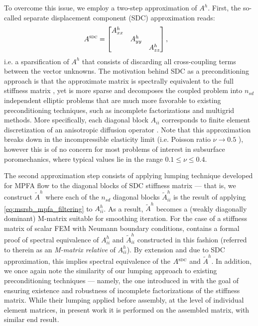 To overcome this issue, we employ a two-step approximation of $A^h$.   First, the so-called separate displacement component (SDC) \cite{Gustafsson1996} approximation reads:
\begin{align}
	A^{\textsc{sdc}} &=
    \begin{bmatrix}
  	    A_{xx}^h &          &        \\
  	             & A_{yy}^h &        \\
  	             &          & A_{zz}^h 
	\end{bmatrix},
    \label{eq:blk_stiff_SDC}
\end{align}
i.e. a sparsification of $A^h$ that consists of discarding all cross-coupling terms between the vector unknowns.   The motivation behind SDC as a preconditioning approach is that the approximate matrix is spectrally equivalent to the full stiffness matrix \cite{Blaheta1994,Gustaffson1998}, yet is more sparse and decomposes the coupled problem into $n_{sd}$ independent elliptic problems that are much more favorable to existing preconditioning techniques, such as incomplete factorizations and multigrid methods.   More specifically, each diagonal block $A_{ii}$ corresponds to finite element discretization of an anisotropic diffusion operator \cite{Bosma2021}.   Note that this approximation breaks down in the incompressible elasticity limit (i.e. Poisson ratio $\nu \to 0.5$ \cite{Axelsson1978}), however this is of no concern for most problems of interest in subsurface poromechanics, where typical values lie in the range $0.1 \leq \nu \leq 0.4$.

The second approximation step consists of applying lumping technique developed for MPFA flow to the diagonal blocks of SDC stiffness matrix --- that is, we construct $\tilde{A}^h$ where each of the $n_{sd}$ diagonal blocks $\tilde{A}_{ii}^h$ is the result of applying \eqref{eq:msrsb_mpfa_filtering} to $A_{ii}^h$.   As a result, $\tilde{A}^h$ becomes a (weakly diagonally dominant) M-matrix suitable for smoothing iteration.   For the case of a stiffness matrix of scalar FEM with Neumann boundary conditions, \cite{Xu2017} contains a formal proof of spectral equivalence of $A_{ii}^h$ and $\tilde{A}_{ii}^h$ constructed in this fashion (referred to therein as an \textit{M-matrix relative} of $A_{ii}^h$).   By extension and due to SDC approximation, this implies spectral equivalence of the $A^{\textsc{sdc}}$ and $\tilde{A}^h$.   In addition, we once again note the similarity of our lumping approach to existing preconditioning techniques --- namely, the one introduced in \cite{Gustafsson1996} with the goal of ensuring existence and robustness of incomplete factorizations of the stiffness matrix.   While their lumping applied before assembly, at the level of individual element matrices, in present work it is performed on the assembled matrix, with similar end result.

